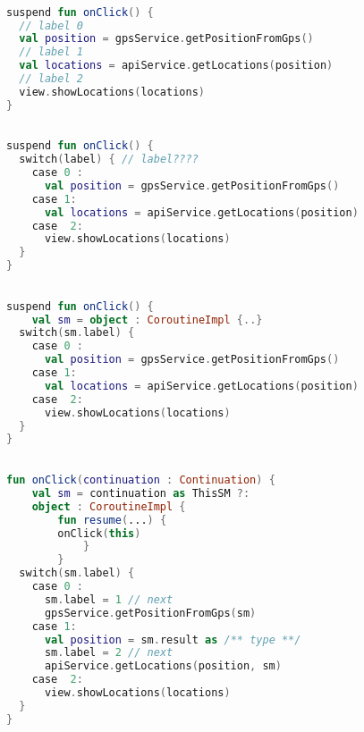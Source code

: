 \documentclass[10pt]{beamer}
\begin{document}
\begin{frame}[fragile]
\begin{lstlisting}[language=Kotlin, basicstyle=\ttfamily]

suspend fun onClick() {
  // label 0 
  val position = gpsService.getPositionFromGps()
  // label 1 
  val locations = apiService.getLocations(position)
  // label 2
  view.showLocations(locations)
}
\end{lstlisting}
\end{frame}
\begin{frame}[fragile]
\begin{lstlisting}[language=Kotlin, basicstyle=\ttfamily]

suspend fun onClick() {
  switch(label) { // label????
    case 0 :
      val position = gpsService.getPositionFromGps()
    case 1: 
      val locations = apiService.getLocations(position)
    case  2:
      view.showLocations(locations)
  }
}
\end{lstlisting}
\end{frame}
\begin{frame}[fragile]
\begin{lstlisting}[language=Kotlin, basicstyle=\ttfamily]

suspend fun onClick() {
	val sm = object : CoroutineImpl {..}
  switch(sm.label) {
    case 0 :
      val position = gpsService.getPositionFromGps()
    case 1: 
      val locations = apiService.getLocations(position)
    case  2:
      view.showLocations(locations)
  }
}
\end{lstlisting}
\end{frame}
\begin{frame}[fragile]
\begin{lstlisting}[language=Kotlin, basicstyle=\ttfamily]

fun onClick(continuation : Continuation) {
	val sm = continuation as ThisSM ?: 
	object : CoroutineImpl {
		fun resume(...) {
		onClick(this)
			} 
		}
  switch(sm.label) { 
    case 0 :
      sm.label = 1 // next 
      gpsService.getPositionFromGps(sm)
    case 1: 
      val position = sm.result as /** type **/ 
      sm.label = 2 // next 
      apiService.getLocations(position, sm)
    case  2:
      view.showLocations(locations)
  }
}
\end{lstlisting}
\end{frame}
\end{document}
